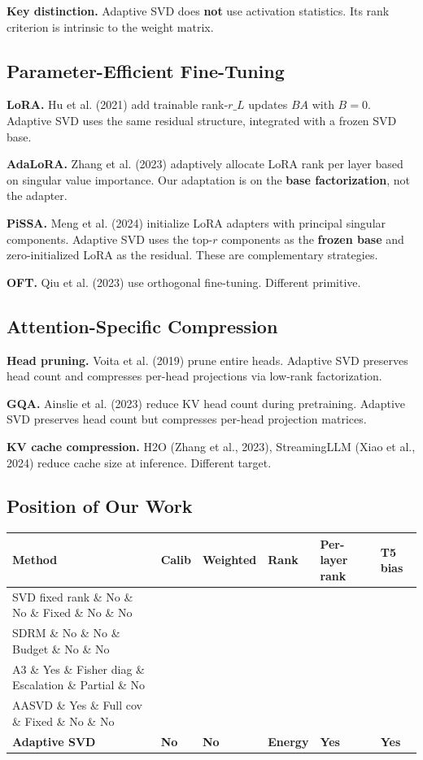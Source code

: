 \textbf{Key distinction.} Adaptive SVD does \textbf{not} use activation statistics. Its 
rank criterion is intrinsic to the weight matrix.

\subsection{Parameter-Efficient Fine-Tuning}

\textbf{LoRA.} Hu et al. (2021) add trainable rank-$r\_L$ updates $B A$ with $B = 0$. 
Adaptive SVD uses the same residual structure, integrated with a frozen SVD base.

\textbf{AdaLoRA.} Zhang et al. (2023) adaptively allocate LoRA rank per layer based 
on singular value importance. Our adaptation is on the \textbf{base factorization}, 
not the adapter.

\textbf{PiSSA.} Meng et al. (2024) initialize LoRA adapters with principal singular 
components. Adaptive SVD uses the top-$r$ components as the \textbf{frozen base} 
and zero-initialized LoRA as the residual. These are complementary strategies.

\textbf{OFT.} Qiu et al. (2023) use orthogonal fine-tuning. Different primitive.

\subsection{Attention-Specific Compression}

\textbf{Head pruning.} Voita et al. (2019) prune entire heads. Adaptive SVD preserves 
head count and compresses per-head projections via low-rank factorization.

\textbf{GQA.} Ainslie et al. (2023) reduce KV head count during pretraining. Adaptive 
SVD preserves head count but compresses per-head projection matrices.

\textbf{KV cache compression.} H2O (Zhang et al., 2023), StreamingLLM (Xiao et al., 
2024) reduce cache size at inference. Different target.

\subsection{Position of Our Work}

\begin{table}[H]
\centering
\small
\begin{tabular}{llllll}
\toprule
\textbf{Method} & \textbf{Calib} & \textbf{Weighted} & \textbf{Rank} & \textbf{Per-layer rank} & \textbf{T5 bias} \\
\midrule
SVD fixed rank \& No \& No \& Fixed \& No \& No \\
SDRM \& No \& No \& Budget \& No \& No \\
A3 \& Yes \& Fisher diag \& Escalation \& Partial \& No \\
AASVD \& Yes \& Full cov \& Fixed \& No \& No \\
\textbf{Adaptive SVD} & \textbf{No} & \textbf{No} & \textbf{Energy} & \textbf{Yes} & \textbf{Yes} \\
\bottomrule
\end{tabular}
\end{table}

